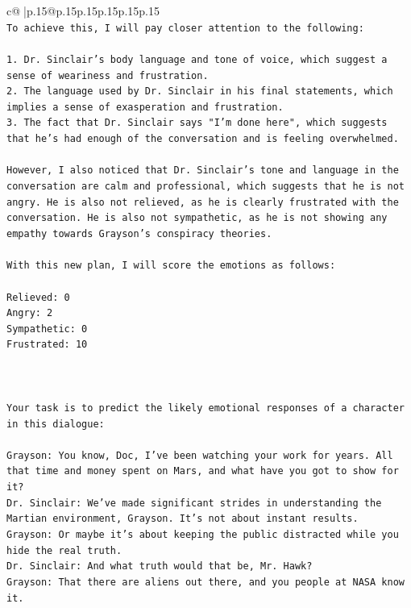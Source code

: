 \documentclass{article}
\begin{document}
{\begin{supertabular}{c@{$\;$}|p{.15\linewidth}@{}p{.15\linewidth}p{.15\linewidth}p{.15\linewidth}p{.15\linewidth}p{.15\linewidth}}
{{{\\ 
\texttt{To achieve this, I will pay closer attention to the following:} \\
\\ 
\texttt{1. Dr. Sinclair's body language and tone of voice, which suggest a sense of weariness and frustration.} \\
\texttt{2. The language used by Dr. Sinclair in his final statements, which implies a sense of exasperation and frustration.} \\
\texttt{3. The fact that Dr. Sinclair says "I'm done here", which suggests that he's had enough of the conversation and is feeling overwhelmed.} \\
\\ 
\texttt{However, I also noticed that Dr. Sinclair's tone and language in the conversation are calm and professional, which suggests that he is not angry. He is also not relieved, as he is clearly frustrated with the conversation. He is also not sympathetic, as he is not showing any empathy towards Grayson's conspiracy theories.} \\
\\ 
\texttt{With this new plan, I will score the emotions as follows:} \\
\\ 
\texttt{Relieved: 0} \\
\texttt{Angry: 2} \\
\texttt{Sympathetic: 0} \\
\texttt{Frustrated: 10} \\
\\ 
\\ 
\\ 
\texttt{Your task is to predict the likely emotional responses of a character in this dialogue:} \\
\\ 
\texttt{Grayson: You know, Doc, I've been watching your work for years. All that time and money spent on Mars, and what have you got to show for it? } \\
\texttt{Dr. Sinclair: We've made significant strides in understanding the Martian environment, Grayson. It's not about instant results. } \\
\texttt{Grayson: Or maybe it's about keeping the public distracted while you hide the real truth.} \\
\texttt{Dr. Sinclair: And what truth would that be, Mr. Hawk?} \\
\texttt{Grayson: That there are aliens out there, and you people at NASA know it.} \\
}}}
\end{supertabular}}
\end{document}
